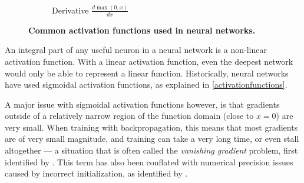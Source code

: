 \documentclass[thesis]{subfiles}
\begin{document}
\begin{figure}[tbp]
\begin{subfigure}[t]{0.48\textwidth}
	\end{subfigure}
	~
	\begin{subfigure}[t]{0.48\textwidth}
		\caption{Derivative $\frac{d \max(0,x)}{dx}$}\label{fig:relugradient}
	\end{subfigure}
	\caption[Activation functions]{\textbf{Common activation functions used in neural networks.}}\label{fig:afunctions}
\end{figure}

An integral part of any useful neuron in a neural network is a non-linear activation function. With a linear activation function, even the deepest network would only be able to represent a linear function. Historically, neural networks have used sigmoidal activation functions, as explained in \cref{activationfunctions}.

A major issue with sigmoidal activation functions however, is that gradients outside of a relatively narrow region of the function domain (close to $x=0$) are very small. When training with backpropagation, this means that most gradients are of very small magnitude, and training can take a very long time, or even stall altogether --- a situation that is often called the \emph{vanishing gradient} problem, first identified by \citet{hochreiter1991untersuchungen}. This term has also been conflated with numerical precision issues caused by incorrect initialization, as identified by \citet{glorot2010understanding}.
\end{document}
